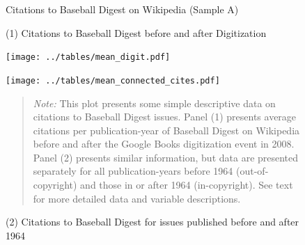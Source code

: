 \begin{figure}[!htbp]
\begin{center}
\caption{Citations to Baseball Digest on Wikipedia (Sample A)}
\label{fig:overview}
\caption*{(1) Citations to Baseball Digest before and after Digitization}
\texttt{[image: ../tables/mean\_digit.pdf]}
\vspace{5mm}
\caption*{(2) Citations to Baseball Digest for issues published before and after 1964}
\texttt{[image: ../tables/mean\_connected\_cites.pdf]}
\end{center}

\begin{quote}
\emph{Note:} This plot presents some simple descriptive data on citations to Baseball Digest issues. Panel (1) presents average citations per publication-year of Baseball Digest on Wikipedia before and after the Google Books digitization event in 2008. Panel (2) presents similar information, but data are presented separately for all publication-years before 1964 (out-of-copyright) and those in or after 1964 (in-copyright). See text for more detailed data and variable descriptions. 
\end{quote}
\end{figure}


